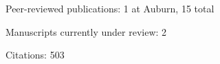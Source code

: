 \begin{tightItemize}
    \item Peer-reviewed publications: 1 at Auburn, 15 total
    \item Manuscripts currently under review: 2
    \item Citations: 503
\end{tightItemize}
